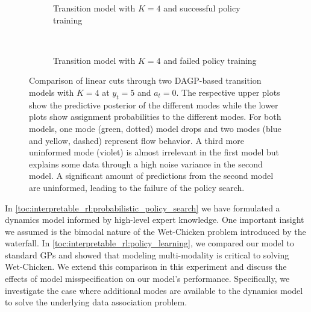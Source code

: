 \begin{figure}[tp]
    \centering
    \begin{subfigure}[t]{\linewidth}
        \centering
        
        
        \caption{
            \label{fig:interpretable_rl:wetchicken:good_cut}
            Transition model with $K=4$ and successful policy training
        }
    \end{subfigure}\\[\figureskip]
    \vspace*{-5pt} %
    \begin{subfigure}[t]{\linewidth}
        \centering
        
        
        \caption{
            \label{fig:interpretable_rl:wetchicken:bad_cut}
            Transition model with $K=4$ and failed policy training
        }
    \end{subfigure}
    \caption[Model-misspecification experiment]{
        \label{fig:interpretable_rl:wetchicken:cut_comparison}
        Comparison of linear cuts through two DAGP-based transition models with $K=4$ at $y_t = 5$ and $a_t=0$.
        The respective upper plots show the predictive posterior of the different modes while the lower plots show assignment probabilities to the different modes.
        For both models, one mode (green, dotted) model drops and two modes (blue and yellow, dashed) represent flow behavior.
        A third more uninformed mode (violet) is almost irrelevant in the first model but explains some data through a high noise variance in the second model.
        A significant amount of predictions from the second model are uninformed, leading to the failure of the policy search.
    }
\end{figure}
In \cref{toc:interpretable_rl:probabilistic_policy_search} we have formulated a dynamics model informed by high-level expert knowledge.
One important insight we assumed is the bimodal nature of the Wet-Chicken problem introduced by the waterfall.
In \cref{toc:interpretable_rl:policy_learning}, we compared our model to standard GPs and showed that modeling multi-modality is critical to solving Wet-Chicken.
We extend this comparison in this experiment and discuss the effects of model misspecification on our model's performance.
Specifically, we investigate the case where additional modes are available to the dynamics model to solve the underlying data association problem.

